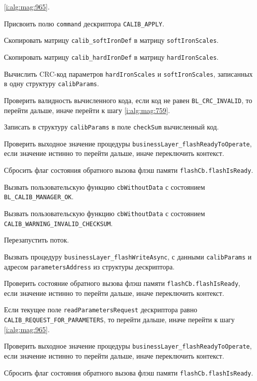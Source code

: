 \begin{enumerate_step}
    \ref{i:alg:mag:965}.
    \item Присвоить полю \lstinline|command| дескриптора \lstinline|CALIB_APPLY|.
    \item Скопировать матрицу \lstinline|calib_softIronDef| в матрицу \lstinline|softIronScales|.
    \item Скопировать матрицу \lstinline|calib_hardIronDef| в матрицу \lstinline|hardIronScales|.
    \item Вычислить CRC-код параметров \lstinline|hardIronScales| и \lstinline|softIronScales|, записанных в одну структуру \lstinline|calibParams|.
    \item Проверить валидность вычисленного кода, если код не равен \lstinline|BL_CRC_INVALID|, то перейти дальше, иначе перейти к шагу \ref{i:alg:mag:759}.
    \item Записать в структуру \lstinline|calibParams| в поле \lstinline|checkSum| вычисленный код.
    \item Проверить выходное значение процедуры \lstinline|businessLayer_flashReadyToOperate|, если значение истинно то перейти дальше, иначе переключить контекст.
    \item Сбросить флаг состояния обратного вызова флэш памяти \lstinline|flashCb.flashIsReady|.
    \item Вызвать пользовательскую функцию \lstinline|cbWithoutData| с состоянием \lstinline|BL_CALIB_MANAGER_OK|.
    \item \label{i:alg:mag:759} Вызвать пользовательскую функцию \lstinline|cbWithoutData| с состоянием \lstinline|CALIB_WARNING_INVALID_CHECKSUM|.
    \item Перезапустить поток.
    \item Вызвать процедуру \lstinline|businessLayer_flashWriteAsync|, с данными \lstinline|calibParams| и адресом \lstinline|parametersAddress| из структуры дескриптора.
    \item Проверить состояние обратного вызова флэш памяти \lstinline|flashCb.flashIsReady|, если значение истинно то перейти дальше, иначе переключить контекст.
    \item \label{i:alg:mag:967} Если текущее поле \lstinline|readParametersRequest| дескриптора равно \lstinline|CALIB_REQUEST_FOR_PARAMETERS|, то перейти дальше, иначе перейти к шагу
    \ref{i:alg:mag:965}. 
    \item Проверить выходное значение процедуры \lstinline|businessLayer_flashReadyToOperate|, если значение истинно то перейти дальше, иначе переключить контекст.
    \item Сбросить флаг состояния обратного вызова флэш памяти \lstinline|flashCb.flashIsReady|.

\end{enumerate_step}
